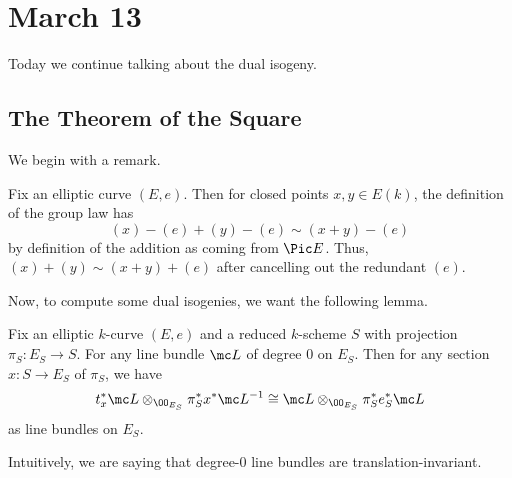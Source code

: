 \documentclass[../notes.tex]{subfiles}
\begin{document}
\section{March 13}

Today we continue talking about the dual isogeny.

\subsection{The Theorem of the Square}
We begin with a remark.
\begin{remark}
	Fix an elliptic curve $(E,e)$. Then for closed points $x,y\in E(k)$, the definition of the group law has
	\[(x)-(e)+(y)-(e)\sim(x+y)-(e)\]
	by definition of the addition as coming from $\Pic E$. Thus, $(x)+(y)\sim(x+y)+(e)$ after cancelling out the redundant $(e)$.
\end{remark}
Now, to compute some dual isogenies, we want the following lemma.
\begin{lemma} \label{lem:almost-square}
	Fix an elliptic $k$-curve $(E,e)$ and a reduced $k$-scheme $S$ with projection $\pi_S\colon E_S\to S$. For any line bundle $\mc L$ of degree $0$ on $E_S$. Then for any section $x\colon S\to E_S$ of $\pi_S$, we have
	\[t_x^*\mc L\otimes_{\OO_{E_S}}\pi_S^*x^*\mc L^{-1}\cong\mc L\otimes_{\OO_{E_S}}\pi_S^*e_S^*\mc L\]
	as line bundles on $E_S$.
\end{lemma}
Intuitively, we are saying that degree-$0$ line bundles are translation-invariant.
\end{document}
